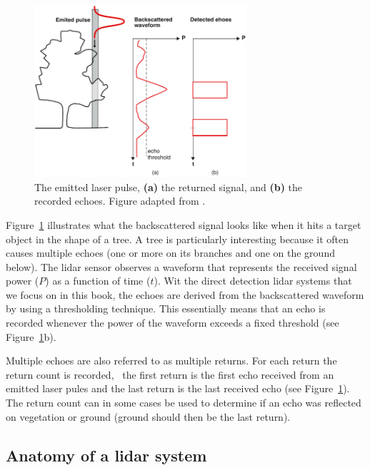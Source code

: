 \begin{figure}
	\centering
	\includegraphics[width=0.7\textwidth]{figs/lidar-multipulse.pdf}
	\caption{The emitted laser pulse, \textbf{(a)} the returned signal, and \textbf{(b)} the recorded echoes. Figure adapted from \citet{Bailly12}.}%
\label{fig:lidar-multipulse}
\end{figure}
Figure~\ref{fig:lidar-multipulse} illustrates what the backscattered signal looks like when it hits a target object in the shape of a tree. 
A tree is particularly interesting because it often causes multiple echoes (one or more on its branches and one on the ground below).  The lidar sensor observes a waveform that represents the received signal power ($P$) as a function of time ($t$). 
Wit the direct detection lidar systems that we focus on in this book, the echoes are derived from the backscattered waveform by using a thresholding technique. This essentially means that an echo is recorded whenever the power of the waveform exceeds a fixed threshold (see Figure~\ref{fig:lidar-multipulse}b). 

Multiple echoes are also referred to as multiple returns. 
For each return the return count is recorded, \eg\ the first return is the first echo received from an emitted laser pules and the last return is the last received echo (see Figure~\ref{fig:lidar-multipulse}). The return count can in some cases be used to determine if an echo was reflected on vegetation or ground (ground should then be the last return).


\subsection{Anatomy of a lidar system}%
\label{lidar:anatomy}

